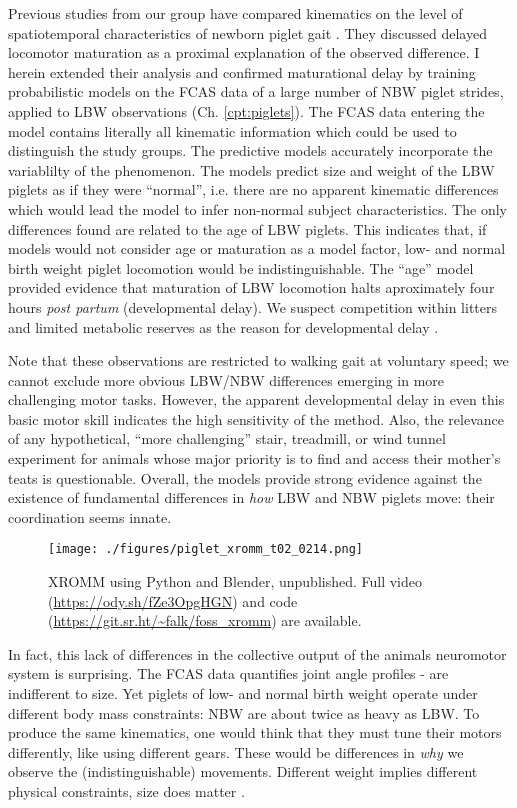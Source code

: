 Previous studies from our group have compared kinematics on the level of spatiotemporal characteristics of newborn piglet gait \citep{VandenHole2018}.
They discussed delayed locomotor maturation as a proximal explanation of the observed difference.
I herein extended their analysis and confirmed maturational delay by training probabilistic models on the FCAS data of a large number of NBW piglet strides, applied to LBW observations (Ch. \ref{cpt:piglets}).
The FCAS data entering the model contains literally all kinematic information which could be used to distinguish the study groups.
The predictive models accurately incorporate the variablilty of the phenomenon.
The models predict size and weight of the LBW piglets as if they were ``normal'', i.e. there are no apparent kinematic differences which would lead the model to infer non-normal subject characteristics.
The only differences found are related to the age of LBW piglets.
This indicates that, if models would not consider age or maturation as a model factor, low- and normal birth weight piglet locomotion would be indistinguishable.
The ``age'' model provided evidence that maturation of LBW locomotion halts aproximately four hours \emph{post partum} (developmental delay).
We suspect competition within litters and limited metabolic reserves as the reason for developmental delay \citep{VandenHole2019}.

Note that these observations are restricted to walking gait at voluntary speed; we cannot exclude more obvious LBW/NBW differences emerging in more challenging motor tasks.
However, the apparent developmental delay in even this basic motor skill indicates the high sensitivity of the method.
Also, the relevance of any hypothetical, ``more challenging'' stair, treadmill, or wind tunnel experiment for animals whose major priority is to find and access their mother's teats is questionable.
Overall, the models provide strong evidence against the existence of fundamental differences in \emph{how} LBW and NBW piglets move: their coordination seems innate.



\begin{figure}[p]
\centering
\texttt{[image: ./figures/piglet\_xromm\_t02\_0214.png]}
\caption{\label{fig:piglet_xromm}XROMM using Python and Blender, unpublished. Full video (\url{https://ody.sh/fZe3OpgHGN}) and code (\url{https://git.sr.ht/\~falk/foss\_xromm}) are available.}
\end{figure}

In fact, this lack of differences in the collective output of the animals neuromotor system is surprising.
The FCAS data quantifies joint angle profiles -  are indifferent to size.
Yet piglets of low- and normal birth weight operate under different body mass constraints: NBW are about twice as heavy as LBW.
To produce the same kinematics, one would think that they must tune their motors differently, like using different gears.
These would be differences in \emph{why} we observe the (indistinguishable) movements.
Different weight implies different physical constraints, size does matter \citep{Aerts2023}.

